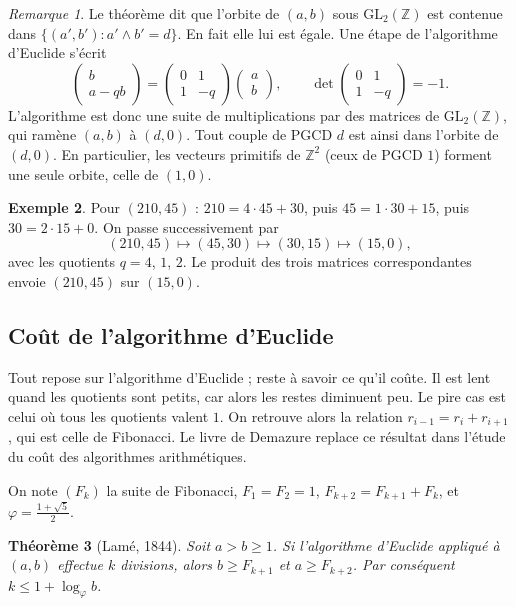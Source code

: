 \documentclass[11pt,a4paper]{article}
\theoremstyle{plain}
\newtheorem{theoreme}{Théorème}[section]
\theoremstyle{definition}
\newtheorem{exemple}[theoreme]{Exemple}
\theoremstyle{remark}
\newtheorem{remarque}[theoreme]{Remarque}
\newcommand{\Z}{\mathbb{Z}}
\newcommand{\GL}{\mathrm{GL}}
\newcommand{\pgcd}{\wedge}
\begin{document}
\begin{remarque}
Le théorème dit que l'orbite de $(a,b)$ sous $\GL_2(\Z)$ est contenue dans $\{(a',b') : a'\pgcd b'=d\}$. En fait elle lui est égale. Une étape de l'algorithme d'Euclide s'écrit
\[
  \begin{pmatrix}b\\a-qb\end{pmatrix}=\begin{pmatrix}0&1\\1&-q\end{pmatrix}\begin{pmatrix}a\\b\end{pmatrix},
  \qquad \det\begin{pmatrix}0&1\\1&-q\end{pmatrix}=-1 .
\]
L'algorithme est donc une suite de multiplications par des matrices de $\GL_2(\Z)$, qui ramène $(a,b)$ à $(d,0)$. Tout couple de PGCD $d$ est ainsi dans l'orbite de $(d,0)$. En particulier, les vecteurs primitifs de $\Z^2$ (ceux de PGCD $1$) forment une seule orbite, celle de $(1,0)$.
\end{remarque}

\begin{exemple}
Pour $(210,45)$ : $210=4\cdot45+30$, puis $45=1\cdot30+15$, puis $30=2\cdot15+0$. On passe successivement par
\[
  (210,45)\longmapsto(45,30)\longmapsto(30,15)\longmapsto(15,0),
\]
avec les quotients $q=4$, $1$, $2$. Le produit des trois matrices correspondantes envoie $(210,45)$ sur $(15,0)$.
\end{exemple}

\subsection{Coût de l'algorithme d'Euclide}

Tout repose sur l'algorithme d'Euclide ; reste à savoir ce qu'il coûte. Il est lent quand les quotients sont petits, car alors les restes diminuent peu. Le pire cas est celui où tous les quotients valent $1$. On retrouve alors la relation $r_{i-1}=r_i+r_{i+1}$, qui est celle de Fibonacci. Le livre de Demazure \cite{demazure} replace ce résultat dans l'étude du coût des algorithmes arithmétiques.

On note $(F_k)$ la suite de Fibonacci, $F_1=F_2=1$, $F_{k+2}=F_{k+1}+F_k$, et $\varphi=\frac{1+\sqrt5}2$.

\begin{theoreme}[Lamé, 1844]\label{thm:lame}
Soit $a>b\geq1$. Si l'algorithme d'Euclide appliqué à $(a,b)$ effectue $k$ divisions, alors $b\geq F_{k+1}$ et $a\geq F_{k+2}$. Par conséquent $k\leq 1+\log_\varphi b$.
\end{theoreme}
\end{document}
